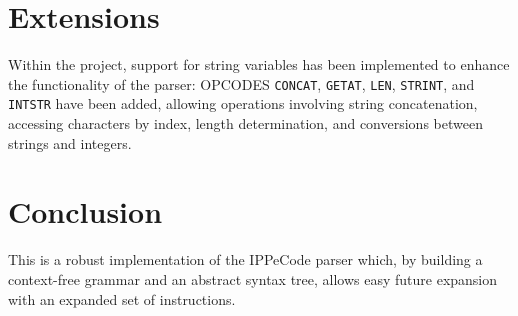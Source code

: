 \documentclass{article}
\begin{document}
\section{Extensions}
Within the project, support for string variables has been implemented to enhance the functionality of the parser: OPCODES \texttt{CONCAT}, \texttt{GETAT}, \texttt{LEN}, \texttt{STRINT}, and \texttt{INTSTR} have been added, allowing operations involving string concatenation, accessing characters by index, length determination, and conversions between strings and integers.

\section{Conclusion}
This is a robust implementation of the IPPeCode parser which, by building a context-free grammar and an abstract syntax tree, allows easy future expansion with an expanded set of instructions.
\end{document}
